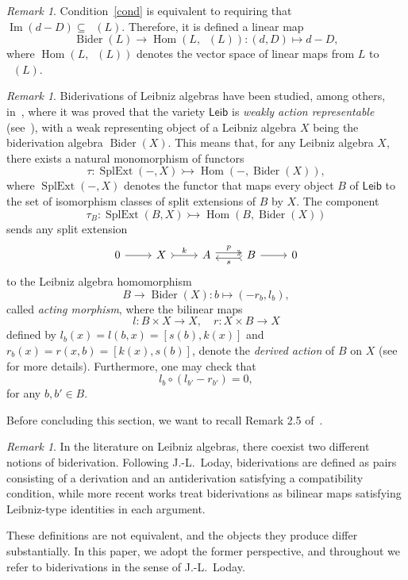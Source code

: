 \documentclass[11pt,a4paper]{amsart}
\theoremstyle{plain}
\theoremstyle{definition}
\theoremstyle{remark}
\newtheorem{remark}[subsection]{Remark}
\numberwithin{equation}{section}
\newcommand{\0}{\emptyset}
\DeclareMathOperator{\Hom}{Hom}
\DeclareMathOperator{\SplExt}{SplExt}
\DeclareMathOperator{\Imm}{Im}
\DeclareMathOperator{\Bider}{Bider}
\DeclareMathOperator{\Zr}{Z_r}
\newcommand{\sLeib}{\ensuremath{\mathsf{Leib}}}
\begin{document}
\begin{remark}
Condition~\eqref{cond} is equivalent to requiring that $\Imm(d-D)\subseteq \Zr(L)$. Therefore, it is defined a linear map
\[
\Bider(L) \to \Hom(L,\Zr(L)) \colon (d,D) \mapsto d-D,
\]
where $\Hom(L,\Zr(L))$ denotes the vector space of linear maps from $L$ to $\Zr(L)$.
\end{remark}

\begin{remark}
Biderivations of Leibniz algebras have been studied, among others, in~\cite{CigoliManciniMetere}, where it was proved that the variety $\sLeib$ is \emph{weakly action representable} (see~\cite{WRA,WRAAlg,XabiMancini}), with a weak representing object of a Leibniz algebra $X$ being the biderivation algebra $\Bider(X)$. This means that, for any Leibniz algebra $X$, there exists a natural monomorphism of functors
\[
\tau \colon \SplExt(-,X) \rightarrowtail \Hom(-,\Bider(X)),
\]
where $\SplExt(-,X)$ denotes the functor that maps every object $B$ of $\sLeib$ to the set of isomorphism classes of split extensions of $B$ by $X$. The component 
\[
\tau_B \colon \SplExt(B,X) \rightarrowtail \Hom(B,\Bider(X))
\]
sends any split extension
\[
\begin{tikzcd}
{0} & {X} & {A} & {B} & {0}
\arrow[from=1-1, to=1-2]
\arrow["{k}", tail, from=1-2, to=1-3]
\arrow["{p}", twoheadrightarrow, shift left, from=1-3, to=1-4]
\arrow["{s}", tail, shift left, from=1-4, to=1-3]
\arrow[from=1-4, to=1-5]
\end{tikzcd}
\]
to the Leibniz algebra homomorphism
\[
B \to \Bider(X) \colon b \mapsto (-r_b,l_b),
\]
called \emph{acting morphism}, where the bilinear maps
\[
l \colon B \times X \to X, \quad r \colon X \times B \to X
\]
defined by $l_b(x)=l(b,x)=[s(b),k(x)]$ and $r_b(x)=r(x,b)=[k(x),s(b)]$, denote the \emph{derived action} of $B$ on $X$ (see~\cite{casas, orzech} for more details). Furthermore, one may check that
\[
l_b \circ (l_{b'} - r_{b'})=0,
\]
for any $b,b' \in B$.
\end{remark}

Before concluding this section, we want to recall Remark 2.5 of~\cite{dibartolo2025biderivationscompleteleibnizalgebras}.

\begin{remark}
In the literature on Leibniz algebras, there coexist two different notions of biderivation. Following J.-L.~Loday, biderivations are defined as pairs consisting of a derivation and an antiderivation satisfying a compatibility condition, while more recent works treat biderivations as bilinear maps satisfying Leibniz-type identities in each argument.
	
These definitions are not equivalent, and the objects they produce differ substantially. In this paper, we adopt the former perspective, and throughout we refer to biderivations in the sense of J.-L.~Loday.
\end{remark}
\end{document}
